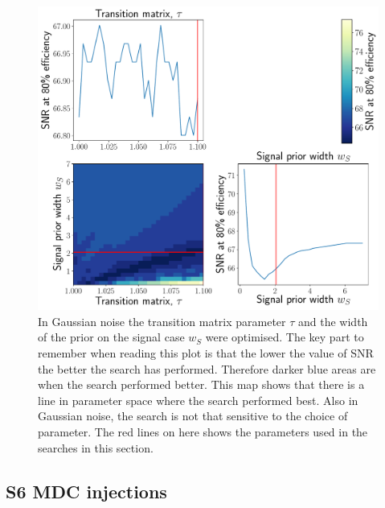 \begin{figure}[h]
    \centering
    \includegraphics[width=0.9\linewidth]{C3_soap/gauss_optimised.pdf}
    \caption[Optimisation of line aware statistic in Gaussian noise.]{In Gaussian noise the transition matrix parameter $\tau$ and the width of the prior on the signal case $w_S$ were optimised. The key part to remember when reading this plot is that the lower the value of \gls{SNR} the better the search has performed. Therefore darker blue areas are when the search performed better. This map shows that there is a line in parameter space where the search performed best. Also in Gaussian noise, the search is not that sensitive to the choice of parameter. The red lines on here shows the parameters used in the searches in this section. }
    \label{soap:las:optimisation:gauss}
\end{figure}


\subsection{S6 MDC injections}

